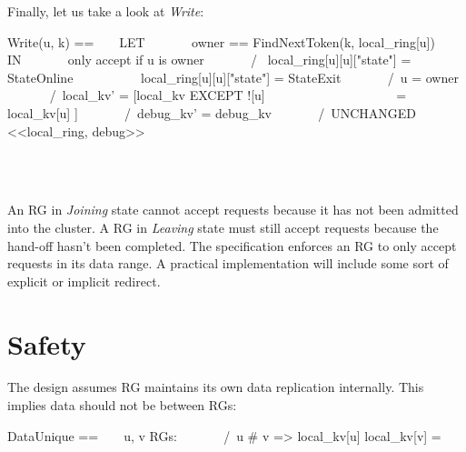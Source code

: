 Finally, let us take a look at \textit{Write}:\\
\begin{tla}
Write(u, k) == 
    LET 
        owner == FindNextToken(k, local_ring[u])
    IN 
        \* only accept if u is owner
        /\ \/ local_ring[u][u]["state"] = StateOnline
           \/ local_ring[u][u]["state"] = StateExit
        /\ u = owner
        /\ local_kv' = [local_kv EXCEPT ![u] 
                        = local_kv[u] ]
        /\ debug_kv' = debug_kv 
        /\ UNCHANGED <<local_ring, debug>>
\end{tla}
\begin{tlatex}
%
%
%
%
%
%
\@xx{}%
%
%
 \@x{\@s{32.8} \.{\land} local\_kv \.{'} \.{=} [ local\_kv {\EXCEPT} {\bang} [
 u ]}%
\@x{\@s{32.8} \.{=} local\_kv [ u ] \.{\cup} \{ k \} ]}%
%
\end{tlatex}
\\

An RG in \textit{Joining} state cannot accept requests because it has not been
admitted into the cluster. A RG in \textit{Leaving} state must still
accept requests because the hand-off hasn't been completed. The specification 
enforces an RG to only accept requests in its data range. A practical
implementation will include some sort of explicit or implicit redirect.

\section{Safety}

The design assumes RG maintains its own data replication internally. This implies 
data should not be between RGs:\\

\begin{tla}
DataUnique == 
    \A u, v \in RGs:
        /\ u # v => local_kv[u] \intersect local_kv[v] = {}
\end{tla}
\begin{tlatex}
%
%
\end{tlatex}


